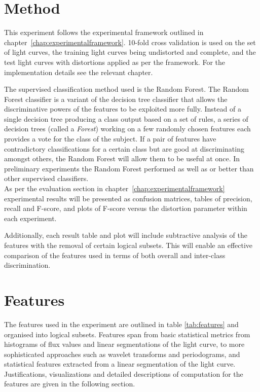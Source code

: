 	\section{Method}
	This experiment follows the experimental framework outlined in chapter~\ref{chap:experimentalframework}. 10-fold cross validation is used on the set of light curves, the training light curves being undistorted and complete, and the test light curves with distortions applied as per the framework. For the implementation details see the relevant chapter.


		The supervised classification method used is the Random Forest. The Random Forest classifier is a variant of the decision tree classifier that allows the discriminative powers of the features to be exploited more fully. Instead of a single decision tree producing a class output based on a set of rules, a series of decision trees (called a \emph{Forest}) working on a few randomly chosen features each provides a vote for the class of the subject. If a pair of features have contradictory classifications for a certain class but are good at discriminating amongst others, the Random Forest will allow them to be useful at once. In preliminary experiments the Random Forest performed as well as or better than other supervised classifiers.\\ %

	As per the evaluation section in chapter~\ref{chap:experimentalframework} experimental results will be presented as confusion matrices, tables of precision, recall and F-score, and plots of F-score versus the distortion parameter within each experiment.
	
	Additionally, each result table and plot will include subtractive analysis of the features with the removal of certain logical subsets. This will enable an effective comparison of the features used in terms of both overall and inter-class discrimination.
	
	\section{Features}
	\label{sec:baselinefeatures}
	The features used in the experiment are outlined in table \ref{tab:features} and organised into logical subsets. Features span from basic statistical metrics from histograms of flux values and linear segmentations of the light curve, to more sophisticated approaches such as wavelet transforms and periodograms, and statistical features extracted from a linear segmentation of the light curve. Justifications, visualizations and detailed descriptions of computation for the features are given in the following section.
	
